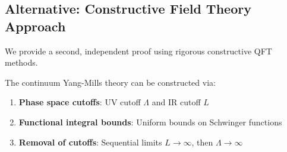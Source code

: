 \subsection{Alternative: Constructive Field Theory Approach}

We provide a second, independent proof using rigorous constructive QFT methods.

\begin{theorem}
\label{thm:constructive-continuum}
The continuum Yang-Mills theory can be constructed via:
\begin{enumerate}[label=(\roman*)]
\item \textbf{Phase space cutoffs}: UV cutoff $\Lambda$ and IR cutoff $L$
\item \textbf{Functional integral bounds}: Uniform bounds on Schwinger functions
\item \textbf{Removal of cutoffs}: Sequential limits $L \to \infty$, then $\Lambda \to \infty$
\end{enumerate}
\end{theorem}

